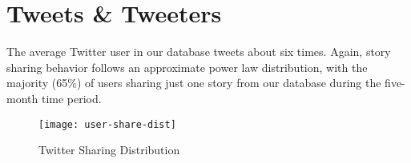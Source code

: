 \section{Tweets \& Tweeters}
The average Twitter user in our database tweets about six times. Again, story sharing behavior follows an approximate power law distribution, with the majority (65\%) of users sharing just one story from our database during the five-month time period.
 

\begin{figure}[H]  
\centering 
  \texttt{[image: user-share-dist]}  
  \caption{Twitter Sharing Distribution
    \label{fig:user-share-dist}}
\end{figure} 
 

  